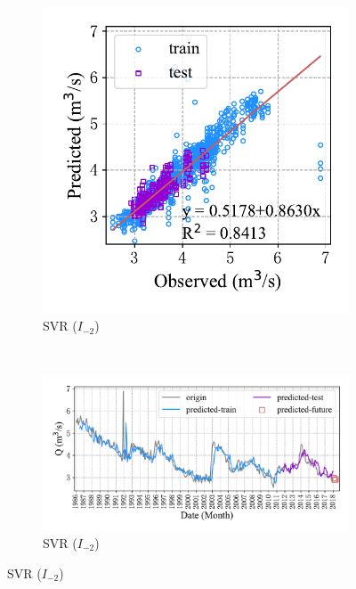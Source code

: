 \begin{figure}[!htbp]
  \\
  \begin{subfigure}[b]{0.305\textwidth}
    \includegraphics[width=\textwidth]{Img/chap4_spr/spr_scatter_in_2_out_4_svr.pdf}
    \vspace{-1.2cm}
    \caption{SVR ($I_{-2}$)}
    \label{fig:spr_scatter_in_2_out_4_svr}
  \end{subfigure}
  ~
  \begin{subfigure}[b]{0.615\textwidth}
    \includegraphics[width=\textwidth]{Img/chap4_spr/spr_series_in_2_out_4_svr.pdf}
    \vspace{-1.2cm}
    \caption{SVR ($I_{-2}$)}
    \label{fig:spr_series_in_2_out_4_svr}
  \end{subfigure}

\end{figure}
